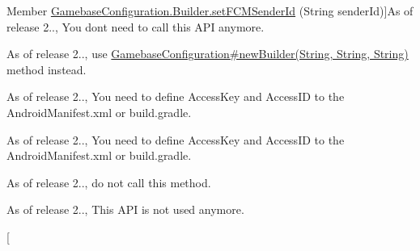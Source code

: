 \begin{DoxyRefList}
Member \hyperlink{classcom_1_1toast_1_1android_1_1gamebase_1_1_gamebase_configuration_1_1_builder_aa042e4ff4f1dd7038b615dec2d8e4e69}{Gamebase\+Configuration.Builder.set\+F\+C\+M\+Sender\+Id} (String sender\+Id)]As of release 2.., You don\textquotesingle{}t need to call this A\+PI anymore.  
\item[\label{deprecated__deprecated000012}%
\Hypertarget{deprecated__deprecated000012}%
Member \hyperlink{classcom_1_1toast_1_1android_1_1gamebase_1_1_gamebase_configuration_1_1_builder_a10964576edd072e214ed8edcd1e7baf8}{Gamebase\+Configuration.Builder.set\+Store\+Code} (String store\+Code)]As of release 2.., use \hyperlink{classcom_1_1toast_1_1android_1_1gamebase_1_1_gamebase_configuration_a7c28786c8e446dd54cb5f4d0797b6564}{Gamebase\+Configuration\#new\+Builder(\+String, String, String)} method instead.  
\item[\label{deprecated__deprecated000015}%
\Hypertarget{deprecated__deprecated000015}%
Member \hyperlink{classcom_1_1toast_1_1android_1_1gamebase_1_1_gamebase_configuration_1_1_builder_a2b5790c8f47b6ed51ff69b9830ca5a2d}{Gamebase\+Configuration.Builder.set\+Tencent\+Access\+Id} (String access\+Id)]As of release 2.., You need to define Access\+Key and Access\+ID to the Android\+Manifest.\+xml or build.\+gradle.  
\item[\label{deprecated__deprecated000014}%
\Hypertarget{deprecated__deprecated000014}%
Member \hyperlink{classcom_1_1toast_1_1android_1_1gamebase_1_1_gamebase_configuration_1_1_builder_ac172551b643355d3ff300fca51c4bd50}{Gamebase\+Configuration.Builder.set\+Tencent\+Access\+Key} (String access\+Key)]As of release 2.., You need to define Access\+Key and Access\+ID to the Android\+Manifest.\+xml or build.\+gradle.  
\item[\label{deprecated__deprecated000011}%
\Hypertarget{deprecated__deprecated000011}%
Member \hyperlink{classcom_1_1toast_1_1android_1_1gamebase_1_1_gamebase_configuration_1_1_builder_a66db0aa4dc8c164fd7d93cd20e0af13e}{Gamebase\+Configuration.Builder.set\+Zone\+Type} (String zone\+Type)]As of release 2.., do not call this method.  
\item[\label{deprecated__deprecated000007}%
\Hypertarget{deprecated__deprecated000007}%
Member \hyperlink{classcom_1_1toast_1_1android_1_1gamebase_1_1_gamebase_configuration_a16a632ddb686090e7c21ecdc727414eb}{Gamebase\+Configuration.get\+F\+C\+M\+Sender\+Id} ()]As of release 2.., This A\+PI is not used anymore.  
\item[\label{deprecated__deprecated000005}%

\end{DoxyRefList}
